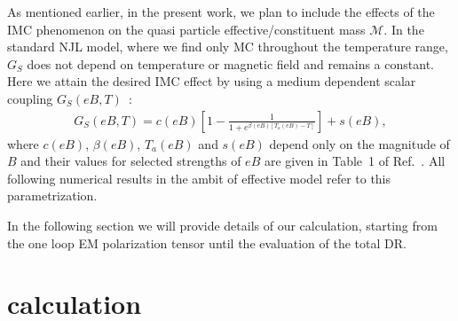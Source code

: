 \documentclass[aps,prd,floatfix,showpacs,showkeys,superscriptadress,unsortedaddress,nofootinbib,onecolumn]{revtex4-1}
\newcommand{\be}{\begin{eqnarray}}
\newcommand{\ee}{\end{eqnarray}}
\begin{document}
As mentioned earlier, in the present work, we plan to include the effects of the IMC phenomenon on the quasi particle effective/constituent mass $\mathcal{M}$. In the standard NJL model, where we find only MC throughout the temperature range, $G_S$ does not depend on temperature or magnetic field and remains a constant. Here we attain the desired IMC effect by using a medium dependent scalar coupling $G_S(eB,T)$~\cite{Farias:2016gmy}:
%
\be
G_S(eB,T) = c(eB)\left[1-\frac{1}{1+e^{\beta(eB)[T_a(eB)-T]}} \right]+s(eB),
\label{GBT}
\ee
%
where $c(eB)$, $\beta(eB)$, $T_a(eB)$ and $s(eB)$ depend only on the magnitude of $B$ and their values for selected strengths of $eB$ are given in Table~1 of Ref.~\cite{Farias:2016gmy}. All following numerical results in the ambit of effective model refer to this parametrization. 

In the following section we will provide details of our calculation, starting from the one loop EM polarization tensor until the evaluation of the total DR.



\section{calculation}
\label{sec:cal}
\end{document}

